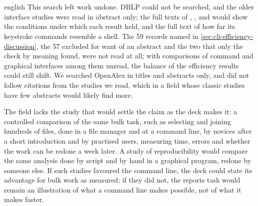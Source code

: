 \section{} %
\label{sec:cli-efficiency-further}

\begin{onlyin}{english} %
This search left work undone.  DBLP could not be searched, and the
older interface studies were read in abstract only; the full texts of
\textcite{Whiteside1985User}, \textcite{Antin1988Empirical},
\textcite{Durham1998Learning} and \textcite{Staggers2000Comparing}
would show the conditions under which each result held, and the full
text of \textcite{Remington2016With} how far its keystroke commands
resemble a shell.  The 59 records named in
\cref{sec:cli-efficiency-discussion}, the 57 excluded for want of an
abstract and the two that only the check by meaning found, were not
read at all; with comparisons of command and graphical interfaces among
them unread, the balance of the efficiency results could still shift.  We
searched OpenAlex in titles and abstracts only, and did not follow
citations from the studies we read, which in a field whose
classic studies have few abstracts would likely find more.

The field lacks the study that would settle the claim as the deck
makes it: a controlled comparison of the same bulk task, such as
selecting and joining hundreds of files, done in a file manager and at
a command line, by novices after a short introduction and by
practised users, measuring time, errors and whether the work can be
redone a week later.  A study of reproducibility would compare the same
analysis done by script and by hand in a graphical program, redone by
someone else.  If such studies favoured the command line, the deck
could state its advantage for bulk work as measured; if they did not,
the reports task would remain an illustration of what a command line
makes possible, not of what it makes faster.
\end{onlyin}
